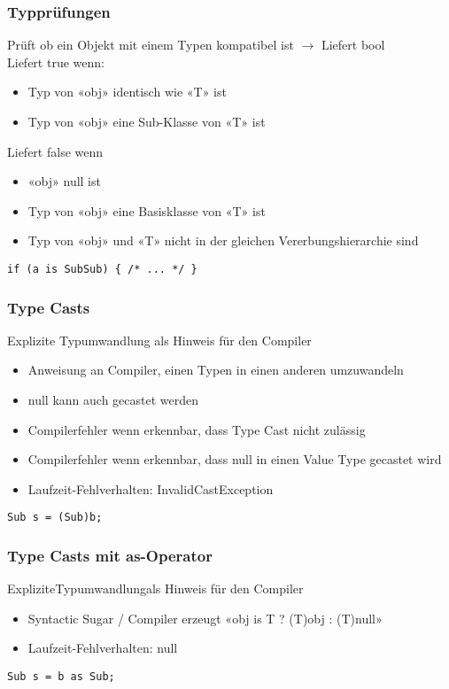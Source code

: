 \subsubsection{Typprüfungen}
Prüft ob ein Objekt mit einem Typen kompatibel ist $\rightarrow$ Liefert bool\\

Liefert true wenn:
\begin{itemize}
    \item Typ von «obj» identisch wie «T» ist
    \item Typ von «obj» eine Sub-Klasse von «T» ist
\end{itemize}
Liefert false wenn
\begin{itemize}
    \item «obj» null ist
    \item Typ von «obj» eine Basisklasse von «T» ist
    \item Typ von «obj» und «T» nicht in der gleichen Vererbungshierarchie sind
\end{itemize}
\begin{lstlisting}
if (a is SubSub) { /* ... */ }
\end{lstlisting}

\subsubsection{Type Casts}
Explizite Typumwandlung als Hinweis für den Compiler
\begin{itemize}
    \item Anweisung an Compiler, einen Typen in einen anderen umzuwandeln
    \item null kann auch gecastet werden
    \item Compilerfehler wenn erkennbar, dass Type Cast nicht zulässig
    \item Compilerfehler wenn erkennbar, dass null in einen Value Type gecastet wird
    \item Laufzeit-Fehlverhalten: InvalidCastException
\end{itemize}
\begin{lstlisting}
Sub s = (Sub)b;
\end{lstlisting}

\subsubsection{Type Casts mit as-Operator}
ExpliziteTypumwandlungals Hinweis für den Compiler
\begin{itemize}
    \item Syntactic Sugar / Compiler erzeugt «obj is T ? (T)obj : (T)null»
    \item Laufzeit-Fehlverhalten: null
\end{itemize}
\begin{lstlisting}
Sub s = b as Sub;
\end{lstlisting}

